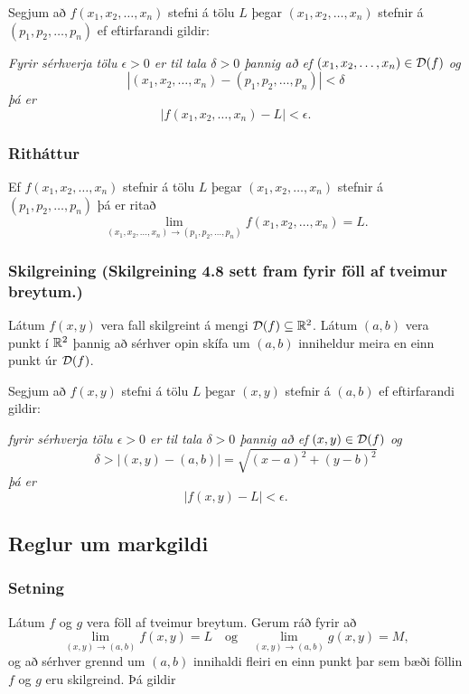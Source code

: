 \smallskip 
\noindent
Segjum að $f(x_1,x_2,\ldots,x_n)$  stefni á tölu $L$ þegar
$(x_1,x_2,\ldots,x_n)$  stefnir á $(p_1,p_2,\ldots,p_n)$ ef
eftirfarandi gildir: 

\smallskip
\noindent
{\em Fyrir sérhverja tölu $\epsilon>0$ er til tala $\delta>0$
þannig að ef $(x_1,x_2,\ldots,x_n)\in{\cal D}(f)$ og  
$$|(x_1,x_2,\ldots,x_n)-(p_1,p_2,\ldots,p_n)|<\delta$$ 
þá er 
$$|f(x_1,x_2,\ldots,x_n)-L|<\epsilon.$$}


\subsubsection{Ritháttur }
Ef $f(x_1,x_2,\ldots,x_n)$  stefnir á tölu $L$ þegar $(x_1,x_2,\ldots,x_n)$  stefnir á $(p_1,p_2,\ldots,p_n)$ þá er ritað 
$$\lim_{(x_1,x_2,\ldots,x_n)\rightarrow (p_1,p_2,\ldots,p_n)}
f(x_1,x_2,\ldots,x_n)=L.$$
 

 \subsubsection{Skilgreining  (Skilgreining 4.8 sett fram fyrir föll af tveimur breytum.)  }
 
  
Látum $f(x,y)$ vera fall skilgreint á mengi  ${\cal D}(f)\subseteq {\mathbb R}^2$.  Látum $(a,b)$ vera punkt í ${\mathbb R}^2$ þannig að sérhver opin skífa um $(a,b)$ inniheldur meira en einn punkt úr ${\cal D}(f)$.

Segjum að $f(x,y)$  stefni á tölu $L$ þegar $(x,y)$  stefnir á $(a,b)$ ef eftirfarandi gildir:

\smallskip
\noindent
{\em fyrir sérhverja tölu $\epsilon>0$ er til tala $\delta>0$
þannig að ef $(x,y)\in{\cal D}(f)$ og
$$\delta>|(x,y)-(a,b)|=\sqrt{(x-a)^2+(y-b)^2}$$ 
þá er  
$$|f(x,y)-L|<\epsilon.$$}

 




\subsection{Reglur um markgildi}
 \subsubsection{Setning }
  Látum $f$ og $g$ vera föll af tveimur breytum.  Gerum ráð  fyrir að 
$$\lim_{(x,y)\rightarrow (a,b)}f(x,y)=L\quad\mbox{og}\quad
\lim_{(x,y)\rightarrow (a,b)}g(x,y)=M,$$
og að sérhver grennd um $(a,b)$ innihaldi fleiri en einn punkt þar sem bæði föllin $f$ og $g$ eru skilgreind. Þá gildir

